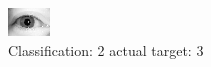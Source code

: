 \begin{figure}[h!]
\begin{center}
\includegraphics[width=0.60\columnwidth]{figures/ID3101_class_2_target_3.png}
\end{center}
\caption{ Classification: 2 actual target: 3}
\label{fig:ID3101_class_2_target_3}
\end{figure}
